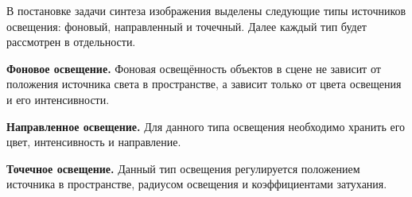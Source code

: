 В постановке задачи синтеза изображения выделены следующие типы источников освещения: фоновый, направленный и точечный. Далее каждый тип будет рассмотрен в отдельности.

\textbf{Фоновое освещение.} Фоновая освещённость объектов в сцене не зависит от положения источника света в пространстве, а зависит только от цвета освещения и его интенсивности.

\textbf{Направленное освещение.} Для данного типа освещения необходимо хранить его цвет, интенсивность и направление.

\textbf{Точечное освещение.} Данный тип освещения регулируется положением источника в пространстве, радиусом освещения и коэффициентами затухания.

